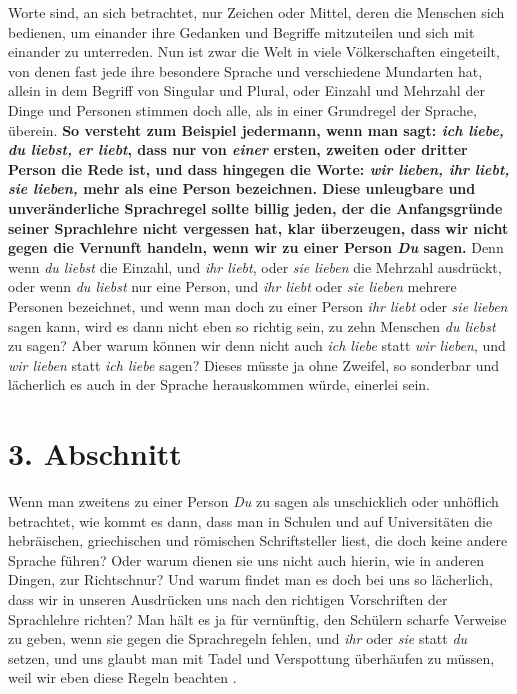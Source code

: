  Worte sind, an sich betrachtet, nur Zeichen oder
Mittel, deren die Menschen sich
bedienen, um einander ihre Gedanken und Begriffe mitzuteilen und sich mit
einander zu unterreden. Nun ist zwar die Welt in viele Völkerschaften
eingeteilt, von denen fast jede ihre besondere Sprache und verschiedene
Mundarten hat, allein in dem Begriff von Singular und Plural, oder
Einzahl und Mehrzahl der Dinge und Personen stimmen doch alle, als in
einer Grundregel der Sprache, überein. \textbf{So versteht zum Beispiel jedermann, wenn
man
sagt: \textit{ich liebe, du liebst, er liebt}, dass nur von \textit{einer}
ersten, zweiten
oder dritter Person die Rede ist, und dass hingegen die Worte: \textit{wir
lieben, ihr
liebt, sie lieben,} mehr als eine Person bezeichnen. Diese unleugbare und
unveränderliche Sprachregel sollte billig jeden, der die Anfangsgründe seiner
Sprachlehre nicht vergessen hat, klar überzeugen, dass wir nicht gegen die
Vernunft handeln, wenn wir zu einer Person \textit{Du} sagen.} Denn wenn
\textit{du
liebst} die Einzahl, und \textit{ihr liebt}, oder \textit{sie lieben} die
Mehrzahl
ausdrückt, oder wenn \textit{du liebst} nur eine Person, und \textit{ihr
liebt} oder
\textit{sie lieben} mehrere Personen bezeichnet, und wenn man doch zu einer
Person
\textit{ihr liebt} oder \textit{sie lieben} sagen kann, wird es dann nicht eben
so
richtig sein, zu zehn Menschen \textit{du liebst} zu sagen? Aber warum können
wir
denn nicht auch \textit{ich liebe} statt \textit{wir lieben}, und \textit{wir
lieben} statt
\textit{ich liebe} sagen? Dieses müsste ja ohne Zweifel, so sonderbar und
lächerlich
es auch in der Sprache herauskommen würde, einerlei sein.

\section{3. Abschnitt} \label{kap10_ab3}

Wenn man zweitens zu einer Person \textit{Du} zu sagen als unschicklich oder
unhöflich betrachtet, wie kommt es dann, dass man in Schulen und auf
Universitäten die hebräischen, griechischen und römischen Schriftsteller liest,
die doch keine andere Sprache führen? Oder warum dienen sie uns nicht auch
hierin, wie in anderen Dingen, zur Richtschnur? Und warum findet man es doch bei
uns so lächerlich, dass wir in unseren Ausdrücken uns nach den richtigen
Vorschriften der Sprachlehre richten? Man hält es ja für vernünftig, den
Schülern scharfe Verweise zu geben, wenn sie gegen die Sprachregeln fehlen, und
\textit{ihr} oder \textit{sie} statt \textit{du} setzen, und uns glaubt man mit
Tadel und Verspottung
überhäufen zu müssen, weil wir eben diese Regeln beachten
.

